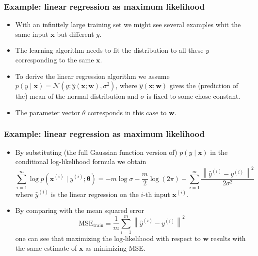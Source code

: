 \documentclass[notes]{beamer}          %
\newcommand{\vect}[1]{\bm{#1}}
\newcommand{\norm}[1]{\left\lVert#1\right\rVert}
\providecommand{\norm}[1]{\lVert#1\rVert}
\newif\iffull
\begin{document}
\begin{frame}
\frametitle{Example: linear regression as maximum likelihood}
    \begin{itemize}
        \item With an infinitely large training set we might see several examples whit the same input $\vect{x}$ but different $y$.
        \item The learning algorithm needs to fit the distribution to all these $y$ corresponding to the same $\vect{x}$.
        \item To derive the linear regression algorithm we assume $p(y \mid \vect{x}) = \mathcal{N}(y; \hat{y}(\vect{x};\vect{w}), \sigma^2)$, where $\hat{y}(\vect{x};\vect{w})$ gives the (prediction of the) mean of the normal distribution and $\sigma$ is fixed to some chose constant.
        \item The parameter vector $\theta$ corresponds in this case to $\vect{w}$.
    \end{itemize}
\end{frame}

\begin{frame}
\frametitle{Example: linear regression as maximum likelihood}
    \begin{itemize}
        \item By substituting (the full Gaussian function version of) $p(y \mid \vect{x})$ in the conditional log-likelihood formula we obtain
        $$
        \sum_{i=1}^{m} \log p(\vect{x}^{(i)} \mid y^{(i)}; \vect{\theta}) =
        -m \log \sigma - \frac{m}{2} \log(2\pi) - \sum_{i=1}^{m }\frac{\norm{\hat{y}^{(i)} - y^{(i)}}^2}{2 \sigma^2}
        $$
        where $\hat{y}^{(i)}$ is the linear regression on the $i$-th input $\vect{x}^{(i)}$.
        \item By comparing with the mean squared error
        $$
           \mbox{MSE}_{\mbox{train}} = \frac{1}{m} \sum_{i=1}^{m} \norm{\hat{y}^{(i)} - y^{(i)}}^2
        $$
        one can see that maximizing the log-likelihood with respect to $\vect{w}$ results with the same estimate of $\vect{x}$ as minimizing MSE. \iffull {\small (The third term in the log-likelihood forumula, needs to be as small as possible.)} \fi
    \end{itemize}
\end{frame}
\end{document}
